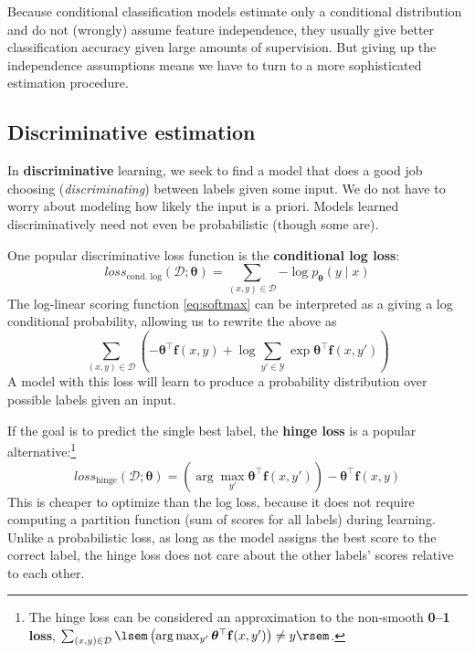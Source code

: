 \documentclass[11pt,letterpaper]{article}
\newcommand{\eref}[1]{\eqref{#1}}
\begin{document}
Because conditional classification models estimate only a conditional distribution and 
do not (wrongly) assume feature independence, they usually give better classification accuracy 
given large amounts of supervision. But giving up the independence assumptions 
means we have to turn to a more sophisticated estimation procedure.

\subsection{Discriminative estimation}

In \textbf{discriminative} learning, we seek to find a model that does a good job choosing 
(\textit{discriminating}) between labels given some input. 
We do not have to worry about modeling how likely the input is a priori.
Models learned discriminatively need not even be probabilistic (though some are).

One popular discriminative loss function is the \textbf{conditional log loss}:
\begin{equation}
\textit{loss}_\text{cond. log}(\mathcal{D}; \boldsymbol{\theta}) = \sum_{(x,y)\in\mathcal{D}}{-\log{p_{\boldsymbol{\theta}}(y \mid x)}}
\end{equation}
The log-linear scoring function \eref{eq:softmax} can be interpreted as a giving a log conditional probability, 
allowing us to rewrite the above as 
\begin{equation}
\sum_{(x,y)\in\mathcal{D}}{\left(-\boldsymbol{\theta}^\top\mathbf{f}(x,y)+\log{\sum_{y'\in\mathcal{Y}}{\exp{\boldsymbol{\theta}^\top\mathbf{f}(x,y')}}}\right)}
\end{equation}
A model with this loss will learn to produce a probability distribution over possible labels given an input.

If the goal is to predict the single best label, the \textbf{hinge loss} is a popular alternative:\footnote{The hinge loss can be considered an approximation to the non-smooth \textbf{0--1 loss},
$\sum_{(x,y)\in\mathcal{D}}{\lsem \left(\arg\max_{y'}{\boldsymbol{\theta}^\top\mathbf{f}(x,y')}\right)\neq y \rsem}$.}
\begin{equation}
\textit{loss}_\text{hinge}(\mathcal{D}; \boldsymbol{\theta}) = \left(\arg\max_{y'}{\boldsymbol{\theta}^\top\mathbf{f}(x,y')}\right) - \boldsymbol{\theta}^\top\mathbf{f}(x,y)
\end{equation}
This is cheaper to optimize than the log loss, because it does not require computing a partition function 
(sum of scores for all labels) during learning.
Unlike a probabilistic loss, as long as the model assigns the best score to the correct label, 
the hinge loss does not care about the other labels' scores relative to each other. 
\end{document}
